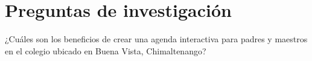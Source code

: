 \section{Preguntas de investigación}
¿Cuáles son los beneficios de crear una agenda interactiva para padres y maestros en el colegio ubicado en Buena Vista, Chimaltenango? 